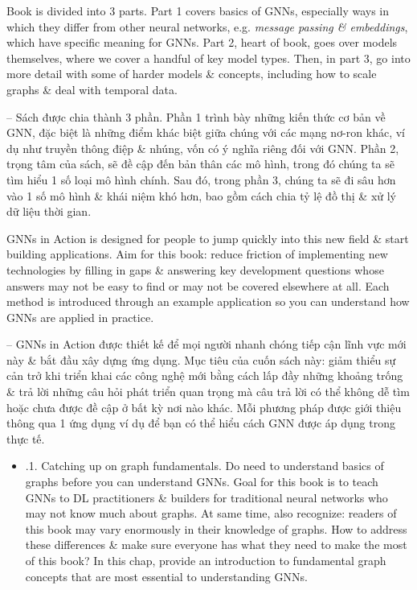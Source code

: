\documentclass{article}
\begin{document}
\begin{itemize}
\begin{itemize}
        Book is divided into 3 parts. Part 1 covers basics of GNNs, especially ways in which they differ from other neural networks, e.g. {\it message passing \& embeddings}, which have specific meaning for GNNs. Part 2, heart of book, goes over models themselves, where we cover a handful of key model types. Then, in part 3, go into more detail with some of harder models \& concepts, including how to scale graphs \& deal with temporal data.

        -- Sách được chia thành 3 phần. Phần 1 trình bày những kiến thức cơ bản về GNN, đặc biệt là những điểm khác biệt giữa chúng với các mạng nơ-ron khác, ví dụ như {truyền thông điệp \& nhúng}, vốn có ý nghĩa riêng đối với GNN. Phần 2, trọng tâm của sách, sẽ đề cập đến bản thân các mô hình, trong đó chúng ta sẽ tìm hiểu 1 số loại mô hình chính. Sau đó, trong phần 3, chúng ta sẽ đi sâu hơn vào 1 số mô hình \& khái niệm khó hơn, bao gồm cách chia tỷ lệ đồ thị \& xử lý dữ liệu thời gian.

        GNNs in Action is designed for people to jump quickly into this new field \& start building applications. Aim for this book: reduce friction of implementing new technologies by filling in gaps \& answering key development questions whose answers may not be easy to find or may not be covered elsewhere at all. Each method is introduced through an example application so you can understand how GNNs are applied in practice.

        -- GNNs in Action được thiết kế để mọi người nhanh chóng tiếp cận lĩnh vực mới này \& bắt đầu xây dựng ứng dụng. Mục tiêu của cuốn sách này: giảm thiểu sự cản trở khi triển khai các công nghệ mới bằng cách lấp đầy những khoảng trống \& trả lời những câu hỏi phát triển quan trọng mà câu trả lời có thể không dễ tìm hoặc chưa được đề cập ở bất kỳ nơi nào khác. Mỗi phương pháp được giới thiệu thông qua 1 ứng dụng ví dụ để bạn có thể hiểu cách GNN được áp dụng trong thực tế.
        \begin{itemize}
            \item {.1. Catching up on graph fundamentals.} Do need to understand basics of graphs before you can understand GNNs. Goal for this book is to teach GNNs to DL practitioners \& builders for traditional neural networks who may not know much about graphs. At same time, also recognize: readers of this book may vary enormously in their knowledge of graphs. How to address these differences \& make sure everyone has what they need to make the most of this book? In this chap, provide an introduction to fundamental graph concepts that are most essential to understanding GNNs.


\end{itemize}
\end{itemize}
\end{itemize}
\end{document}
